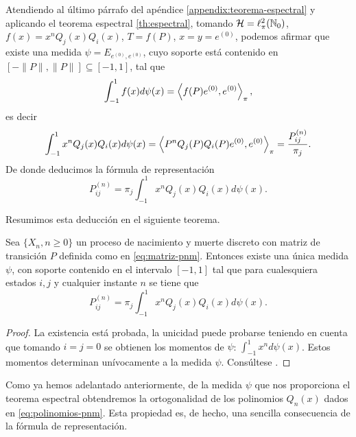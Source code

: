     Atendiendo al último párrafo del apéndice \ref{appendix:teorema-espectral} y aplicando el teorema espectral \ref{th:espectral}, tomando $\mathcal{H}=\ell_\pi^2(\mathbb{N}_0)$, $f(x)=x^n Q_j(x)Q_i(x)$, $T=f(P)$, $x=y=e^{(0)}$, podemos afirmar que existe una medida $\psi=E_{e^{(0)},e^{(0)}}$, cuyo soporte está contenido en $[-\|P\|,\|P\|]\subseteq[-1,1]$, tal que 
    \begin{equation*}
        \int_{-1}^1 f(x)d\psi(x) = \left\langle f(P)e^{(0)} , e^{(0)} \right\rangle_\pi,
    \end{equation*}
    es decir
    \begin{equation*}
        \int_{-1}^1 x^n Q_j(x)Q_i(x)d\psi(x) = \left\langle P^n Q_j(P)Q_i(P)e^{(0)} , e^{(0)} \right\rangle_\pi = \dfrac{P_{ij}^{(n)}}{\pi_j}.
    \end{equation*}
    De donde deducimos la fórmula de representación
    \begin{equation*}
        P_{ij}^{(n)}=\pi_j \int_{-1}^1 x^n Q_j(x)Q_i(x)d\psi(x).
    \end{equation*}

    Resumimos esta deducción en el siguiente teorema.

    \begin{teorema}
        Sea $\{X_n, n\geq 0\}$ un proceso de nacimiento y muerte discreto con matriz de transición $P$ definida como en \eqref{eq:matriz-pnm}. Entonces existe una única medida $\psi$, con soporte contenido en el intervalo $[-1,1]$ tal que para cualesquiera estados $i,j$ y cualquier instante $n$ se tiene que
        \begin{equation}
            \label{eq:formula-representacion}
            P_{ij}^{(n)}=\pi_j \int_{-1}^1 x^n Q_j(x)Q_i(x)d\psi(x).
        \end{equation}
    \end{teorema}
    \begin{proof}
        La existencia está probada, la unicidad puede probarse teniendo en cuenta que tomando $i=j=0$ se obtienen los momentos de $\psi$: $\int_{-1}^1 x^n d\psi(x)$. Estos momentos determinan unívocamente a la medida $\psi$. Consúltese \cite[Theorem 1]{random-walks}.
    \end{proof}


    Como ya hemos adelantado anteriormente, de la medida $\psi$ que nos proporciona el teorema espectral obtendremos la ortogonalidad de los polinomios $Q_n(x)$ dados en \eqref{eq:polinomios-pnm}. Esta propiedad es, de hecho, una sencilla consecuencia de la fórmula de representación.

